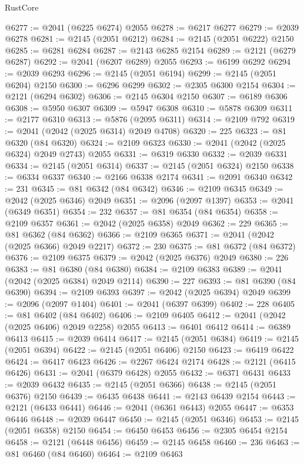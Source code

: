 \begin{lexlean}{RustCore}
\begin{coremodule}
@6277 := @2041 (@6225 @6274) @2055
@6278 := @6217 @6277
@6279 := @2039 @6278
@6281 := @2145 (@2051 @6212)
@6284 := @2145 (@2051 @6222) @2150
@6285 := @6281 @6284
@6287 := @2143 @6285 @2154
@6289 := @2121 (@6279 @6287)
@6292 := @2041 (@6207 @6289) @2055
@6293 := @6199 @6292
@6294 := @2039 @6293
@6296 := @2145 (@2051 @6194)
@6299 := @2145 (@2051 @6204) @2150
@6300 := @6296 @6299
@6302 := @2305 @6300 @2154
@6304 := @2121 (@6294 @6302)
@6306 := @2145 @6304 @2150
@6307 := @6189 @6306
@6308 := @5950 @6307
@6309 := @5947 @6308
@6310 := @5878 @6309
@6311 := @2177 @6310
@6313 := @5876 (@2095 @6311)
@6314 := @2109 @792
@6319 := @2041 (@2042 (@2025 @6314) @2049 @4708)
@6320 := 225
@6323 := @81 @6320 (@84 @6320)
@6324 := @2109 @6323
@6330 := @2041 (@2042 (@2025 @6324) @2049 @2743) @2055
@6331 := @6319 @6330
@6332 := @2039 @6331
@6334 := @2145 (@2051 @6314)
@6337 := @2145 (@2051 @6324) @2150
@6338 := @6334 @6337
@6340 := @2166 @6338 @2174
@6341 := @2091 @6340
@6342 := 231
@6345 := @81 @6342 (@84 @6342)
@6346 := @2109 @6345
@6349 := @2042 (@2025 @6346) @2049
@6351 := @2096 (@2097 @1397)
@6353 := @2041 (@6349 @6351)
@6354 := 232
@6357 := @81 @6354 (@84 @6354)
@6358 := @2109 @6357
@6361 := @2042 (@2025 @6358) @2049
@6362 := 229
@6365 := @81 @6362 (@84 @6362)
@6366 := @2109 @6365
@6371 := @2041 (@2042 (@2025 @6366) @2049 @2217)
@6372 := 230
@6375 := @81 @6372 (@84 @6372)
@6376 := @2109 @6375
@6379 := @2042 (@2025 @6376) @2049
@6380 := 226
@6383 := @81 @6380 (@84 @6380)
@6384 := @2109 @6383
@6389 := @2041 (@2042 (@2025 @6384) @2049 @2114)
@6390 := 227
@6393 := @81 @6390 (@84 @6390)
@6394 := @2109 @6393
@6397 := @2042 (@2025 @6394) @2049
@6399 := @2096 (@2097 @1404)
@6401 := @2041 (@6397 @6399)
@6402 := 228
@6405 := @81 @6402 (@84 @6402)
@6406 := @2109 @6405
@6412 := @2041 (@2042 (@2025 @6406) @2049 @2258) @2055
@6413 := @6401 @6412
@6414 := @6389 @6413
@6415 := @2039 @6414
@6417 := @2145 (@2051 @6384)
@6419 := @2145 (@2051 @6394)
@6422 := @2145 (@2051 @6406) @2150
@6423 := @6419 @6422
@6424 := @6417 @6423
@6426 := @2267 @6424 @2174
@6428 := @2121 (@6415 @6426)
@6431 := @2041 (@6379 @6428) @2055
@6432 := @6371 @6431
@6433 := @2039 @6432
@6435 := @2145 (@2051 @6366)
@6438 := @2145 (@2051 @6376) @2150
@6439 := @6435 @6438
@6441 := @2143 @6439 @2154
@6443 := @2121 (@6433 @6441)
@6446 := @2041 (@6361 @6443) @2055
@6447 := @6353 @6446
@6448 := @2039 @6447
@6450 := @2145 (@2051 @6346)
@6453 := @2145 (@2051 @6358) @2150
@6454 := @6450 @6453
@6456 := @2305 @6454 @2154
@6458 := @2121 (@6448 @6456)
@6459 := @2145 @6458
@6460 := 236
@6463 := @81 @6460 (@84 @6460)
@6464 := @2109 @6463

\end{coremodule}
\end{lexlean}
